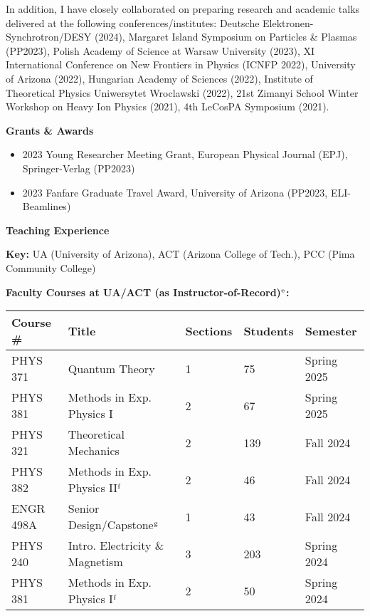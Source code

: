\documentclass[11pt]{article}
\begin{document}
\noindent In addition, I have closely collaborated on preparing research and academic talks delivered at the following conferences/institutes: Deutsche Elektronen-Synchrotron/DESY (2024), Margaret Island Symposium on Particles \& Plasmas (PP2023), Polish Academy of Science at Warsaw University (2023), XI International Conference on New Frontiers in Physics (ICNFP 2022), University of Arizona (2022), Hungarian Academy of Sciences (2022), Institute of Theoretical Physics Uniwersytet Wroclawski (2022), 21st Zimanyi School Winter Workshop on Heavy Ion Physics (2021), 4th LeCosPA Symposium (2021).

\medskip

{\Large\textbf{Grants \& Awards}}

\begin{itemize}[leftmargin=*,nosep]
    \item 2023 Young Researcher Meeting Grant, European Physical Journal (EPJ), Springer-Verlag (PP2023)
    \item 2023 Fanfare Graduate Travel Award, University of Arizona (PP2023, ELI-Beamlines)
\end{itemize}

\medskip

{\Large\textbf{Teaching Experience}}

\textbf{Key:} UA (University of Arizona), ACT (Arizona College of Tech.), PCC (Pima Community College)

\textbf{Faculty Courses at UA/ACT (as Instructor-of-Record)\(^{\rm e}\):}\\
{\normalsize
\begin{tabular}{@{}p{2.5cm} p{6.0cm} p{2.0cm} p{2.0cm} p{3.0cm}@{}}
    \toprule
    \textbf{Course \#} & \textbf{Title} & \textbf{Sections} & \textbf{Students} & \textbf{Semester} \\
    \midrule
    PHYS 371   & Quantum Theory                    & 1 & 75  & Spring 2025 \\
    PHYS 381   & Methods in Exp. Physics I         & 2 & 67  & Spring 2025 \\
    PHYS 321   & Theoretical Mechanics             & 2 & 139 & Fall 2024 \\
    PHYS 382   & Methods in Exp. Physics II\(^{\rm f}\)       & 2 & 46  & Fall 2024 \\
    ENGR 498A  & Senior Design/Capstone\(^{\rm g}\)           & 1 & 43  & Fall 2024 \\
    PHYS 240   & Intro. Electricity \& Magnetism    & 3 & 203 & Spring 2024 \\
    PHYS 381   & Methods in Exp. Physics I\(^{\rm f}\)        & 2 & 50  & Spring 2024 \\
    \bottomrule
\end{tabular}
}
\end{document}
